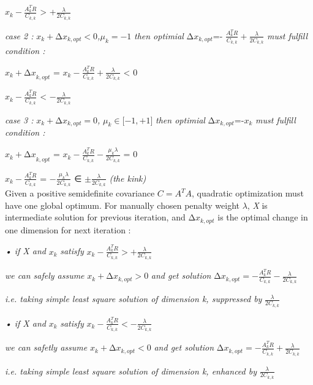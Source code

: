 \(x_{k} - \frac{A_{k}^{T}R}{C_{k,k}}\) \textgreater{}
+\(\frac{\lambda}{2C_{k,k}}\)

\emph{case 2 :}
\(x_{k} + {\mathrm{\Delta}x}_{k,opt} < 0\)\emph{,}\(\mu_{k} = - 1\)
\emph{then optimial} \({\mathrm{\Delta}x}_{k,opt}\)=-
\(\frac{A_{k}^{T}R}{C_{k,k}} + \frac{\lambda}{{2C}_{k,k}}\) \emph{must
fulfill condition :}

\({x_{k} + \mathrm{\Delta}x}_{k,opt}\) =
\(x_{k} - \frac{A_{k}^{T}R}{C_{k,k}} + \frac{\lambda}{2C_{k,k}}\)
\textless{} 0

\(x_{k} - \frac{A_{k}^{T}R}{C_{k,k}}\) \textless{}
\(- \frac{\lambda}{2C_{k,k}}\)

\emph{case 3 :} \(x_{k} + {\mathrm{\Delta}x}_{k,opt} = 0\)\emph{,}
\(\mu_{k} \in \lbrack - 1, + 1\rbrack\) \emph{then optimial}
\({\mathrm{\Delta}x}_{k,opt}\)=-\(x_{k}\) \emph{must fulfill condition
:}

\({x_{k} + \mathrm{\Delta}x}_{k,opt}\) =
\(x_{k} - \frac{A_{k}^{T}R}{C_{k,k}} - \frac{\mu_{k}\lambda}{2C_{k,k}}\)
= 0

\(x_{k} - \frac{A_{k}^{T}R}{C_{k,k}}\) =
\(- \frac{\mu_{k}\lambda}{2C_{k,k}}\) ∈ \(\pm \frac{\lambda}{2C_{k,k}}\)
\emph{(the kink)}\\
Given a positive semidefinite covariance \(C = A^{T}A\), quadratic
optimization must have one global optimum. For manually chosen penalty
weight \(\lambda\), \emph{X} is intermediate solution for previous
iteration, and \({\mathrm{\Delta}x}_{k,opt}\) is the optimal change in
one dimension for next iteration :

\emph{• if X and} \(x_{k}\) \emph{satisfy}
\(x_{k} - \frac{A_{k}^{T}R}{C_{k,k}} > + \frac{\lambda}{2C_{k,k}}\)

\emph{we can safely assume} \(x_{k} + {\mathrm{\Delta}x}_{k,opt} > 0\)
\emph{and get solution}
\({\mathrm{\Delta}x}_{k,opt} = - \frac{A_{k}^{T}R}{C_{k,k}} - \frac{\lambda}{2C_{k,k}}\)

\emph{i.e. taking simple least square solution of dimension k,
suppressed by} \(\frac{\lambda}{2C_{k,k}}\)

\emph{• if X and} \(x_{k}\) \emph{satisfy}
\(x_{k} - \frac{A_{k}^{T}R}{C_{k,k}} < - \frac{\lambda}{2C_{k,k}}\)

\emph{we can safetly assume} \(x_{k} + {\mathrm{\Delta}x}_{k,opt} < 0\)
\emph{and get solution}
\({\mathrm{\Delta}x}_{k,opt} = - \frac{A_{k}^{T}R}{C_{k,k}} + \frac{\lambda}{2C_{k,k}}\)

\emph{i.e. taking simple least square solution of dimension k, enhanced
by} \(\frac{\lambda}{2C_{k,k}}\)

